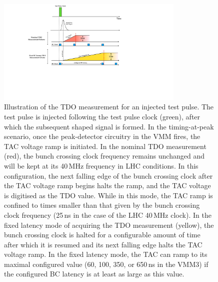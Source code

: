 \begin{figure}[!htb]
    \begin{center}
        \includegraphics[width=0.8\textwidth]{figures/nsw/calibration/tdo_illustrationPDF}
        \caption{
            Illustration of the TDO measurement for an injected test pulse.
            The test pulse is injected following the test pulse clock (green), after
            which the subsequent shaped signal is formed.
            In the timing-at-peak scenario, once the peak-detector circuitry in the VMM fires,
            the TAC voltage ramp is initiated.
            In the nominal TDO measurement (red), the bunch crossing clock frequency remains unchanged
            and will be kept at its 40\,MHz frequency in LHC conditions.
            In this configuration, the next falling edge of the bunch crossing clock after
            the TAC voltage ramp begins halts the ramp, and the TAC voltage is digitised as
            the TDO value.
            While in this mode, the TAC ramp is confined to times smaller than that given by the bunch crossing
            clock frequency (25\,ns in the case of the LHC 40\,MHz clock).
            In the fixed latency mode of acquiring the TDO measurement (yellow), the bunch crossing clock
            is halted for a configurable amount of time after which it is resumed and its
            next falling edge halts the TAC voltage ramp.
            In the fixed latency mode, the TAC can ramp to its maximal configured value (60, 100, 350, or 650\,ns in the VMM3)
            if the configured BC latency is at least as large as this value.
        }
        \label{fig:tdo_illustration}
    \end{center}
\end{figure}

